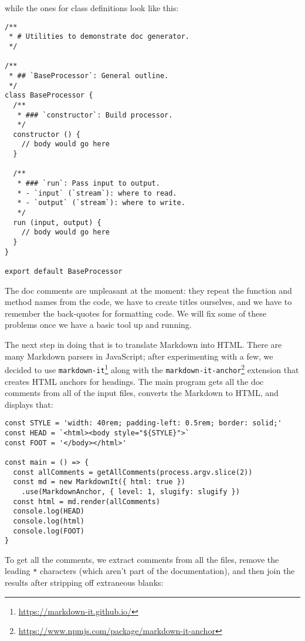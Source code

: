 \documentclass[krantzl]{krantz}
\newcommand{\hreffoot}[2]{{#1}\footnote{\href{#2}{#2}}}
\begin{document}
\noindent while the ones for class definitions look like this:


\begin{lstlisting}[frame=tblr]
/**
 * # Utilities to demonstrate doc generator.
 */

/**
 * ## `BaseProcessor`: General outline.
 */
class BaseProcessor {
  /**
   * ### `constructor`: Build processor.
   */
  constructor () {
    // body would go here
  }

  /**
   * ### `run`: Pass input to output.
   * - `input` (`stream`): where to read.
   * - `output` (`stream`): where to write.
   */
  run (input, output) {
    // body would go here
  }
}

export default BaseProcessor
\end{lstlisting}



The doc comments are unpleasant at the moment:
they repeat the function and method names from the code,
we have to create titles ourselves,
and we have to remember the back-quotes for formatting code.
We will fix some of these problems once we have a basic tool up and running.


The next step in doing that is to translate Markdown into HTML.
There are many Markdown parsers in JavaScript;
after experimenting with a few,
we decided to use \hreffoot{\texttt{markdown-it}}{https://markdown-it.github.io/}
along with the \hreffoot{\texttt{markdown-it-anchor}}{https://www.npmjs.com/package/markdown-it-anchor} extension
that creates HTML anchors for headings.
The main program gets all the doc comments from all of the input files,
converts the Markdown to HTML,
and displays that:


\begin{lstlisting}[frame=tblr]
const STYLE = 'width: 40rem; padding-left: 0.5rem; border: solid;'
const HEAD = `<html><body style="${STYLE}">`
const FOOT = '</body></html>'

const main = () => {
  const allComments = getAllComments(process.argv.slice(2))
  const md = new MarkdownIt({ html: true })
    .use(MarkdownAnchor, { level: 1, slugify: slugify })
  const html = md.render(allComments)
  console.log(HEAD)
  console.log(html)
  console.log(FOOT)
}
\end{lstlisting}



To get all the comments,
we extract comments from all the files,
remove the leading \texttt{*} characters (which aren’t part of the documentation),
and then join the results after stripping off extraneous blanks:
\end{document}
